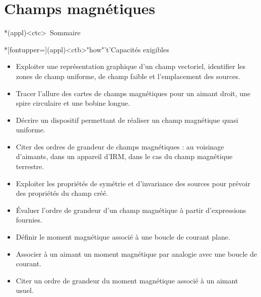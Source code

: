 \documentclass[../../main/main.tex]{subfiles}
\begin{document}
\setcounter{chapter}{4}


\chapter{Champs magnétiques}

\vspace*{\fill}

\begin{tcn}*(appl)<ctc>{\iconsomm~Sommaire}
	\let\item\olditem
	\vspace{-15pt}
	\minitoc
	\vspace{-25pt}
\end{tcn}

\begin{tcn}*[fontupper=\small](appl)<ctb>"how"'t'{Capacités exigibles}
	\begin{itemize}[label=\rcheck]
		\item Exploiter une représentation graphique d’un champ vectoriel,
		      identifier les zones de champ uniforme, de champ faible et l’emplacement
		      des sources.

		\item Tracer l’allure des cartes de champs magnétiques pour un aimant droit,
		      une spire circulaire et une bobine longue.

		\item Décrire un dispositif permettant de réaliser un champ magnétique quasi
		      uniforme.

		\item Citer des ordres de grandeur de champs magnétiques : au voisinage
		      d’aimants, dans un appareil d’IRM, dans le cas du champ magnétique
		      terrestre.

		\item Exploiter les propriétés de symétrie et d’invariance des sources pour
		      prévoir des propriétés du champ créé.

		\item Évaluer l’ordre de grandeur d’un champ magnétique à partir
		      d’expressions fournies.

		\item Définir le moment magnétique associé à une boucle de courant plane.

		\item Associer à un aimant un moment magnétique par analogie avec une boucle
		      de courant.

		\item Citer un ordre de grandeur du moment magnétique associé à un aimant
		      usuel.
	\end{itemize}
\end{tcn}
\end{document}
